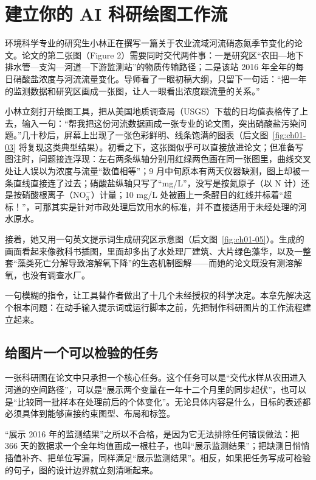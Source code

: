 \chapter{建立你的 AI 科研绘图工作流}
\usetikzlibrary{decorations.pathreplacing}

环境科学专业的研究生小林正在撰写一篇关于农业流域河流硝态氮季节变化的论文。论文的第二张图（Figure 2）需要同时交代两件事：一是研究区“农田—地下排水管—支沟—河道—下游监测站”的物质传输路径；二是该站 2016 年全年的每日硝酸盐浓度与河流流量变化。导师看了一眼初稿大纲，只留下一句话：“把一年的监测数据和研究区画成一张图，让人一眼看出浓度跟流量的关系。”

小林立刻打开绘图工具，把从美国地质调查局（USGS）下载的日均值表格传了上去，输入一句：“帮我把这份河流数据画成一张专业的论文图，突出硝酸盐污染问题。”几十秒后，屏幕上出现了一张色彩鲜明、线条饱满的图表（后文图~\ref{fig:ch01-03} 将复现这类典型结果）。初看之下，这张图似乎可以直接放进论文；但准备写图注时，问题接连浮现：左右两条纵轴分别用红绿两色画在同一张图里，曲线交叉处让人误以为浓度与流量“数值相等”；9 月中旬原本有两天仪器缺测，图上却被一条直线直接连了过去；硝酸盐纵轴只写了“mg/L”，没写是按氮原子（以 N 计）还是按硝酸根离子（$\text{NO}_3^-$）计量；10 mg/L 处被画上一条醒目的红线并标着“超标！”，可那其实是针对市政处理后饮用水的标准，并不直接适用于未经处理的河水原水。

接着，她又用一句英文提示词生成研究区示意图（后文图~\ref{fig:ch01-05}）。生成的画面看起来像教科书插图，里面却多出了水处理厂建筑、大片绿色藻华，以及一整套“藻类死亡分解导致溶解氧下降”的生态机制图解——而她的论文既没有测溶解氧，也没有调查水厂。

一句模糊的指令，让工具替作者做出了十几个未经授权的科学决定。本章先解决这个根本问题：在动手输入提示词或运行脚本之前，先把制作科研图片的工作流程建立起来。

\section{给图片一个可以检验的任务}

一张科研图在论文中只承担一个核心任务。这个任务可以是“交代水样从农田进入河道的空间路径”，可以是“展示两个变量在一年十二个月里的同步起伏”，也可以是“比较同一批样本在处理前后的个体变化”。无论具体内容是什么，目标的表述都必须具体到能够直接约束图型、布局和标签。

“展示 2016 年的监测结果”之所以不合格，是因为它无法排除任何错误做法：把 366 天的数据求一个全年均值画成一根柱子，也叫“展示监测结果”；把缺测日悄悄插值补齐、把单位写漏，同样满足“展示监测结果”。相反，如果把任务写成可检验的句子，图的设计边界就立刻清晰起来。

